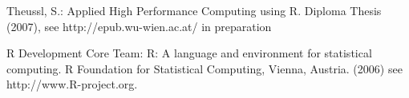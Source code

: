 \documentclass[a4paper,fleqn]{article}
\begin{document}
\begin{thebibliography}{2}
%
Theussl, S.:
Applied High Performance Computing using R.
Diploma Thesis (2007), see http://epub.wu-wien.ac.at/ in preparation

R Development Core Team:
R: A language and environment for statistical computing. R Foundation
for Statistical Computing, Vienna, Austria. (2006)
see http://www.R-project.org.

\end{thebibliography}
\end{document}
